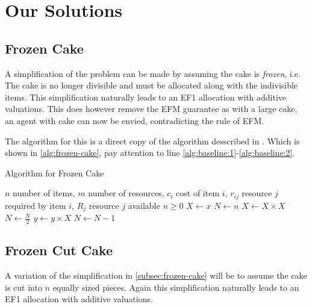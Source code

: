 \section{Our Solutions}\label{sec:our-solutions}



\subsection{Frozen Cake}\label{subsec:frozen-cake}
A simplification of the problem can be made by assuming the cake is \textit{frozen}, i.e. The cake is no longer divisible and must be allocated along with the indivisible items. This simplification naturally leads to an EF1 allocation with additive valuations. This does however remove the EFM guarantee as with a large cake, an agent with cake can now be envied, contradicting the rule of EFM. 

The algorithm for this is a direct copy of the algorithm desscribed in \cite{ef1}. Which is shown in \autoref{alg:frozen-cake}, pay attention to line \ref{alg:baseline:1}-\ref{alg:baseline:2}.

\begin{algorithm}
    \caption{Algorithm for Frozen Cake}\label{alg:frozen-cake}
    \begin{algorithmic}[1]
        \Require $n$ number of items, $m$ number of resources, $c_i$ cost of item $i$, $r_{ij}$ resource $j$ required by item $i$, $R_j$ resource $j$ available
        \Ensure $n \geq 0$ 
        \State $X \gets x$
        \State $N \gets n$
         \label{alg:baseline:1}
                \State $X \gets X \times X$
                \State $N \gets \frac{N}{2}$  
             \label{alg:baseline:2}
                \State $y \gets y \times X$
                \State $N \gets N - 1$
            \EndIf
        \EndWhile
    \end{algorithmic}
\end{algorithm}



\subsection{Frozen Cut Cake}\label{subsec:frozen-cut-cake}
A variation of the simplification in \autoref{subsec:frozen-cake} will be to assume the cake is cut into $n$ equally sized pieces. Again this simplification naturally leads to an EF1 allocation with additive valuations. 

